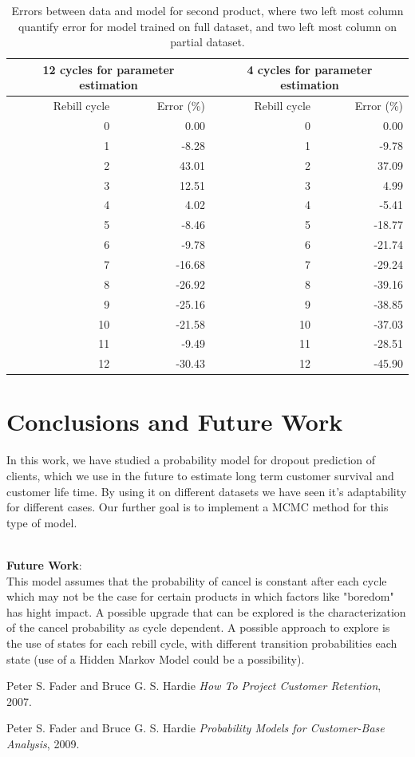 \documentclass[paper=a4, fontsize=11pt]{scrartcl} %
\numberwithin{equation}{section} %
\numberwithin{figure}{section} %
\numberwithin{table}{section} %
\begin{document}
\begin{table}[ht]
	\centering
	\begin{tabular}{rrrr}
		\hline
		\multicolumn{2}{c|}{12 cycles for parameter estimation} & \multicolumn{2}{c}{4 cycles for parameter estimation} \\
		\hline
		Rebill cycle & Error (\%) & Rebill cycle &  Error (\%) \\ 
		\hline
		0 & 0.00 & 0 & 0.00\\ 
		1 & -8.28 & 1 & -9.78\\ 
		2 & 43.01 & 2 & 37.09 \\ 
		3 & 12.51 & 3 & 4.99 \\ 
		4 & 4.02 & 4 & -5.41\\ 
		5 & -8.46 & 5 & -18.77 \\ 
		6 & -9.78 & 6 & -21.74 \\ 
		7 & -16.68 & 7 & -29.24  \\ 
		8 & -26.92 & 8 & -39.16 \\ 
		9 & -25.16 & 9 & -38.85 \\ 
		10 & -21.58 & 10 & -37.03 \\ 
		11 & -9.49 & 11 & -28.51 \\ 
		12 & -30.43 & 12 & -45.90 \\ 
		\hline
	\end{tabular}
	\caption{Errors between data and model for second product, where two left most column quantify error for model trained on full dataset, and two left most column on partial dataset.}
	\label{SV}
\end{table}

\newpage
\section{Conclusions and Future Work}

In this work, we have studied a probability model for dropout prediction of clients, which we use in the future to estimate long term customer survival and customer life time. By using it on different datasets we have seen it's adaptability for different cases. Our further goal is to implement a MCMC method for this type of model.

 \hfill\\
\textbf{Future Work}:
 \hfill\\
 
This model assumes that the probability of cancel is constant after each cycle which may not be the case for certain products in which factors like "boredom" has hight impact. A possible upgrade that can be explored is the characterization of the cancel probability as cycle dependent. A possible approach to explore is the use of states for each rebill cycle, with different transition probabilities each state (use of a Hidden Markov Model could be a possibility).


\newpage
\begin{thebibliography}{9}
	
	Peter S. Fader and Bruce G. S. Hardie
	\textit{ How To Project Customer
		Retention},
	2007.
	
	Peter S. Fader and Bruce G. S. Hardie
	\textit{ Probability Models for Customer-Base Analysis},
	2009.
	
\end{thebibliography}
\end{document}
